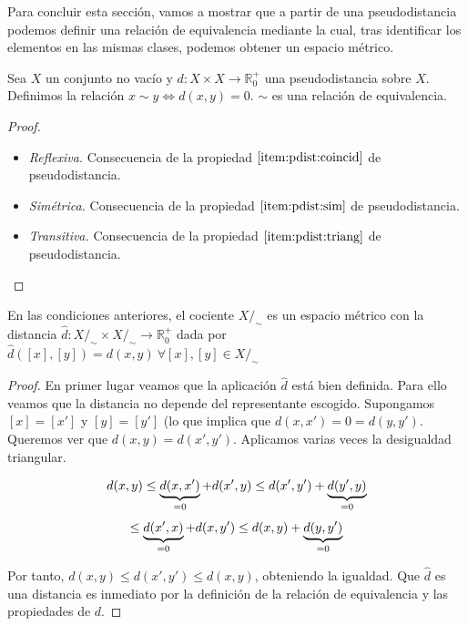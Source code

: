 \documentclass{book}
\begin{document}
Para concluir esta sección, vamos a mostrar que a partir de una pseudodistancia podemos definir una relación de equivalencia mediante la cual, tras identificar los elementos en las mismas clases, podemos obtener un espacio métrico.

\begin{prop}
	Sea $X$ un conjunto no vacío y $d:X\times X \to \mathbb{R}^+_0$ una pseudodistancia sobre $X$. Definimos la relación $x \sim y \iff d(x,y)=0$. $\sim$ es una relación de equivalencia.
\end{prop}

\begin{proof}
$ $ \newline
\begin{itemize}
	\item \emph{Reflexiva.} Consecuencia de la propiedad $\ref{item:pdist:coincid}$ de pseudodistancia.
	\item \emph{Simétrica.} Consecuencia de la propiedad $\ref{item:pdist:sim}$ de pseudodistancia.
	\item \emph{Transitiva.} Consecuencia de la propiedad $\ref{item:pdist:triang}$ de pseudodistancia.
\end{itemize}

\end{proof}

\begin{thm} \label{thm:quotient_dist}

En las condiciones anteriores, el cociente $X/_\sim$ es un espacio métrico con la distancia $\hat{d}:X/_\sim \times X/_\sim \to \mathbb{R}^+_0$ dada por $\hat{d}([x],[y])=d(x,y) \ \forall[x],[y] \in X/_\sim$

\end{thm}

\begin{proof}

En primer lugar veamos que la aplicación $\hat{d}$ está bien definida. Para ello veamos que la distancia no depende del representante escogido. Supongamos $[x]=[x']$ y $[y]=[y']$ (lo que implica que $d(x,x')=0=d(y,y')$. Queremos ver que $d(x,y)=d(x',y')$. Aplicamos varias veces la desigualdad triangular.

\[d(x,y)\le \underbrace{d(x,x')}_{=0}+d(x',y) \le d(x',y')+\underbrace{d(y',y)}_{=0}\]
\[\le \underbrace{d(x',x)}_{=0}+d(x,y') \le d(x,y) + \underbrace{d(y,y')}_{=0} \]

Por tanto, $d(x,y) \le d(x',y') \le d(x,y)$, obteniendo la igualdad. Que $\hat{d}$ es una distancia es inmediato por la definición de la relación de equivalencia y las propiedades de $d$.

\end{proof}
\end{document}
